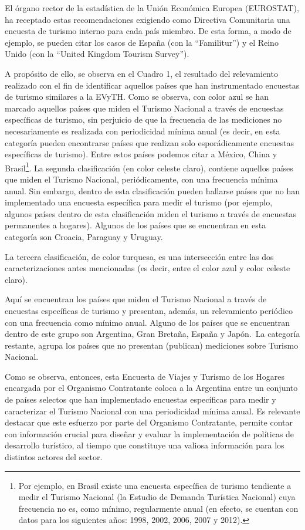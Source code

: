 \documentclass[
  openany]{book}
\begin{document}
El órgano rector de la estadística de la Unión Económica Europea
(EUROSTAT), ha receptado estas recomendaciones exigiendo como Directiva
Comunitaria una encuesta de turismo interno para cada país miembro. De
esta forma, a modo de ejemplo, se pueden citar los casos de España (con
la ``Familitur'') y el Reino Unido (con la ``United Kingdom Tourism
Survey'').

A propósito de ello, se observa en el Cuadro 1, el resultado del
relevamiento realizado con el fin de identificar aquellos países que han
instrumentado encuestas de turismo similares a la EVyTH. Como se
observa, con color azul se han marcado aquellos países que miden el
Turismo Nacional a través de encuestas específicas de turismo, sin
perjuicio de que la frecuencia de las mediciones no necesariamente es
realizada con periodicidad mínima anual (es decir, en esta categoría
pueden encontrarse países que realizan solo esporádicamente encuestas
específicas de turismo). Entre estos países podemos citar a México,
China y Brasil\footnote{Por ejemplo, en Brasil existe una encuesta específica de
  turismo tendiente a medir el Turismo Nacional (la Estudio de Demanda
  Turística Nacional) cuya frecuencia no es, como mínimo, regularmente
  anual (en efecto, se cuentan con datos para los siguientes años:
  1998, 2002, 2006, 2007 y 2012).}. La segunda clasificación (en color celeste
claro), contiene aquellos países que miden el Turismo Nacional,
periódicamente, con una frecuencia mínima anual. Sin embargo, dentro de
esta clasificación pueden hallarse países que no han implementado una
encuesta específica para medir el turismo (por ejemplo, algunos países
dentro de esta clasificación miden el turismo a través de encuestas
permanentes a hogares). Algunos de los países que se encuentran en esta
categoría son Croacia, Paraguay y Uruguay.

La tercera clasificación, de color turquesa, es una intersección entre
las dos caracterizaciones antes mencionadas (es decir, entre el color
azul y color celeste claro).

Aquí se encuentran los países que miden el Turismo Nacional a través de
encuestas específicas de turismo y presentan, además, un relevamiento
periódico con una frecuencia como mínimo anual. Alguno de los países que
se encuentran dentro de este grupo son Argentina, Gran Bretaña, España y
Japón.~La categoría restante, agrupa los países que no presentan
(publican) mediciones sobre Turismo Nacional.

Como se observa, entonces, esta Encuesta de Viajes y Turismo de los Hogares encargada por el Organismo Contratante coloca a la Argentina entre un conjunto de países selectos que han implementado encuestas específicas para medir y caracterizar el Turismo Nacional con una periodicidad mínima anual. Es relevante destacar que este esfuerzo por parte del Organismo Contratante, permite contar con información crucial para diseñar y evaluar la implementación de políticas de desarrollo turístico, al tiempo que constituye una valiosa información para los distintos actores del sector.
\end{document}

